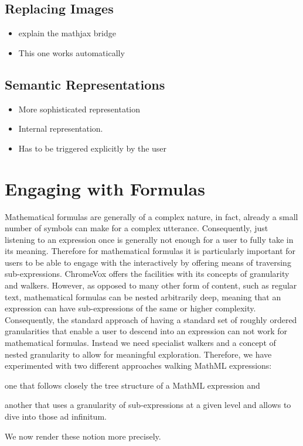 \documentclass{sig-alternate}
\begin{document}
\subsection{Replacing Images}
\label{sec:images}

\begin{itemize}
\item explain the mathjax bridge
\item This one works automatically
\end{itemize}

\subsection{Semantic Representations}
\label{sec:semantic}

\begin{itemize}
\item More sophisticated representation
\item Internal representation.
\item Has to be triggered explicitly by the user
\end{itemize}

\section{Engaging with Formulas}
\label{sec:explore}

Mathematical formulas are generally of a complex nature, in fact, already a
small number of symbols can make for a complex utterance.  Consequently, just
listening to an expression once is generally not enough for a user to fully take
in its meaning.  Therefore for mathematical formulas it is particularly
important for users to be able to engage with the interactively by offering
means of traversing sub-expressions.  ChromeVox offers the facilities with its
concepts of granularity and walkers. However, as opposed to many other form of
content, such as regular text, mathematical formulas can be nested arbitrarily
deep, meaning that an expression can have sub-expressions of the same or higher
complexity. Consequently, the standard approach of having a standard set of
roughly ordered granularities that enable a user to descend into an expression
can not work for mathematical formulas. Instead we need specialist walkers and a
concept of nested granularity to allow for meaningful exploration. Therefore,
we have experimented with two different approaches walking MathML expressions:
\begin{inparaenum}[(1)]
\item one that follows closely the tree structure of a MathML expression and
\item another that uses a granularity of sub-expressions at a given level and
  allows to dive into those ad infinitum.
\end{inparaenum}
We now render these notion more precisely.
\end{document}
